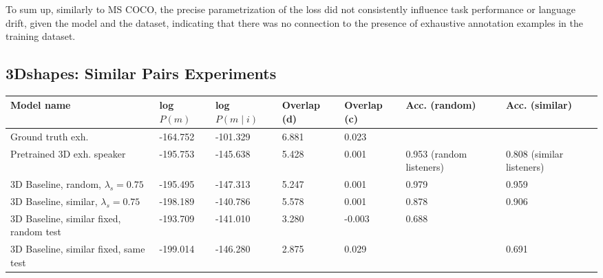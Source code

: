 To sum up, similarly to MS COCO, the precise parametrization of the loss did not consistently influence task performance or language drift, given the model and the dataset, indicating that there was no connection to the presence of exhaustive annotation examples in the training dataset.

\subsection{3Dshapes: Similar Pairs Experiments}
\label{expt:3dsapes_similar}

\begin{table}[]
	\begin{tabularx}{\textwidth}{|X|l|l|X|X|X|X|}
		\hline
		\textbf{Model name}                                    & \textbf{log $P(m)$} & \textbf{log $P(m \mid i)$} & \textbf{Overlap (d)} & \textbf{Overlap (c)} & \textbf{Acc. (random)} & \textbf{Acc. (similar)} \\ \hline
		Ground truth exh.       &      -164.752            &         -101.329               &       6.881             &      0.023               &                 &                \\ \hline
		Pretrained 3D exh. speaker                            &       -195.753            &         -145.638               &        5.428              &      0.001                & 0.953 (random listeners)                 & 0.808 (similar listeners)                 \\ \hline
		3D Baseline, random, $\lambda_s = 0.75$  &       -195.495        &           -147.313           &          5.247            &         0.001             & 0.979                                    &                        0.959                   \\ \hline
		3D Baseline, similar, $\lambda_s = 0.75$ &      -198.189             &       -140.786                 &           5.578           &        0.001              & 0.878                      &            0.906                        \\ \hline
		3D Baseline, similar fixed, random test &       -193.709            &    -141.010                  &        3.280            &      -0.003         &            0.688       &                           \\ \hline
		3D Baseline, similar fixed, same test &      -199.014        &        -146.280           &        2.875       &      0.029   &              &          0.691                   \\ \hline

\end{tabularx}
\end{table}
